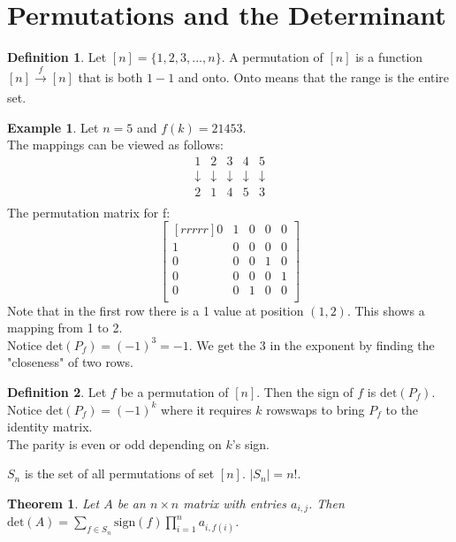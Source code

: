 \documentclass{report}
\theoremstyle{plain}
\newtheorem*{thrm}{Theorem}
\theoremstyle{definition}
\newtheorem*{ex}{Example}
\newtheorem*{defn}{Definition}
\theoremstyle{plain}
\begin{document}
\section{Permutations and the Determinant}
\begin{defn}
Let $[n]=\{1,2,3,...,n\}$. A permutation of $[n]$ is a function $[n]\xrightarrow[]{f} [n]$ that is both $1-1$ and onto. Onto means that the range is the entire set.
\end{defn}
\begin{ex}
Let $n=5$ and $f(k)=21453$.\\
The mappings can be viewed as follows:
\[ \begin{matrix}1&2&3&4&5\\\downarrow&\downarrow&\downarrow&\downarrow&\downarrow\\2&1&4&5&3\\\end{matrix} \]
The permutation matrix for f:
\[ \begin{bmatrix}[rrrrr]0&1&0&0&0\\1&0&0&0&0\\0&0&0&1&0\\0&0&0&0&1\\0&0&1&0&0\\\end{bmatrix} \]
Note that in the first row there is a 1 value at position $(1,2)$. This shows a mapping from 1 to 2.\\
Notice $\mathrm{det}(P_f)=(-1)^3 = -1$. We get the 3 in the exponent by finding the "closeness" of two rows.
\end{ex}
\begin{defn}
Let $f$ be a permutation of $[n]$. Then the sign of $f$ is $\mathrm{det}(P_f)$.\\
Notice $\mathrm{det}(P_f)=(-1)^k$ where it requires $k$ rowswaps to bring $P_f$ to the identity matrix.\\
The parity is even or odd depending on $k$'s sign.
\end{defn}
$S_n$ is the set of all permutations of set $[n]$. $|S_n| = n!$.
\begin{thrm}
Let $A$ be an $n \times n$ matrix with entries $a_{i,j}$. Then $\mathrm{det}(A)=\sum_{f\in S_n} \mathrm{sign}(f) \prod_{i=1}^na_{i,f(i)}$.
\end{thrm}
\end{document}
